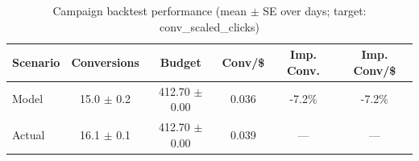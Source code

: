\begin{table}[htbp]
\centering
\caption{Campaign backtest performance (mean $\pm$ SE over days; target: conv_scaled_clicks)}
\begin{tabular}{lccccc}
\toprule
Scenario & Conversions & Budget & Conv/\$ & Imp. Conv. & Imp. Conv/\$ \\
\midrule
Model & 15.0 $\pm$ 0.2 & 412.70 $\pm$ 0.00 & 0.036 & -7.2\% & -7.2\% \\
Actual & 16.1 $\pm$ 0.1 & 412.70 $\pm$ 0.00 & 0.039 & --- & --- \\
\bottomrule
\end{tabular}

\end{table}

